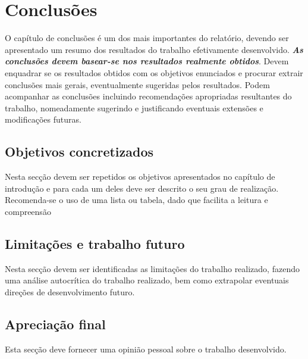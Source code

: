 \chapter{Conclusões}
\label{cap:conclusão}

O capítulo de conclusões é um dos mais importantes do relatório, devendo ser apresentado um resumo dos resultados do trabalho efetivamente desenvolvido. \textit{\textbf{As conclusões devem basear-se nos resultados realmente obtidos}}. Devem enquadrar se os resultados obtidos com os objetivos enunciados e procurar extrair conclusões mais gerais, eventualmente sugeridas pelos resultados. Podem acompanhar as conclusões incluindo recomendações apropriadas resultantes do trabalho, nomeadamente sugerindo e justificando eventuais extensões e modificações futuras.



\section{Objetivos concretizados}

Nesta secção devem ser repetidos os objetivos apresentados no capítulo de introdução e para cada um deles deve ser descrito o seu grau de realização. Recomenda-se o uso de uma lista ou tabela, dado que facilita a leitura e compreensão



\section{Limitações e trabalho futuro}

Nesta secção devem ser identificadas as limitações do trabalho realizado, fazendo uma análise autocrítica do trabalho realizado, bem como extrapolar eventuais direções de desenvolvimento futuro.



\section{Apreciação final}

Esta secção deve fornecer uma opinião pessoal sobre o trabalho desenvolvido. 

